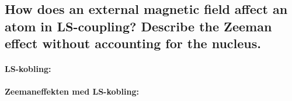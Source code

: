 \subsection{How does an external magnetic field affect an atom in LS-coupling? Describe the Zeeman effect without accounting for the nucleus.}


\paragraph{LS-kobling:}


\paragraph{Zeemaneffekten med LS-kobling:}